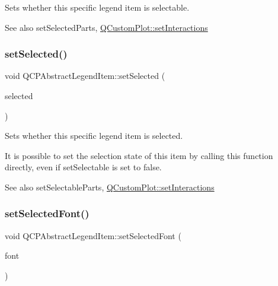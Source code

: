 Sets whether this specific legend item is selectable.

\begin{DoxySeeAlso}{See also}
set\+Selected\+Parts, \hyperlink{classQCustomPlot_a5ee1e2f6ae27419deca53e75907c27e5}{Q\+Custom\+Plot\+::set\+Interactions} 
\end{DoxySeeAlso}
\mbox{\label{classQCPAbstractLegendItem_a6eed93b0ab99cb3eabb043fb08179c2b}} 
\subsubsection{\texorpdfstring{set\+Selected()}{setSelected()}}
{\footnotesize\ttfamily void Q\+C\+P\+Abstract\+Legend\+Item\+::set\+Selected (\begin{DoxyParamCaption}\item[{bool}]{selected }\end{DoxyParamCaption})}

Sets whether this specific legend item is selected.

It is possible to set the selection state of this item by calling this function directly, even if set\+Selectable is set to false.

\begin{DoxySeeAlso}{See also}
set\+Selectable\+Parts, \hyperlink{classQCustomPlot_a5ee1e2f6ae27419deca53e75907c27e5}{Q\+Custom\+Plot\+::set\+Interactions} 
\end{DoxySeeAlso}
\mbox{\label{classQCPAbstractLegendItem_a91db5aee48617a9d3206e61376807365}} 
\subsubsection{\texorpdfstring{set\+Selected\+Font()}{setSelectedFont()}}
{\footnotesize\ttfamily void Q\+C\+P\+Abstract\+Legend\+Item\+::set\+Selected\+Font (\begin{DoxyParamCaption}\item[{const Q\+Font \&}]{font }\end{DoxyParamCaption})}


